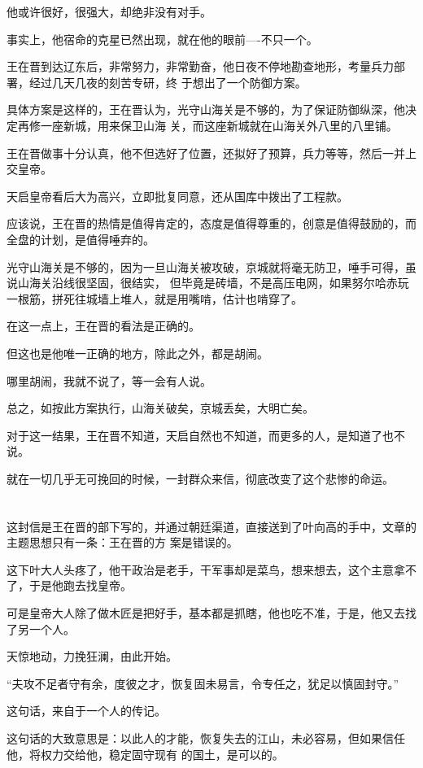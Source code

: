 \documentclass[11pt,a4paper,onecolumn]{article}
\begin{document}
他或许很好，很强大，却绝非没有对手。

事实上，他宿命的克星已然出现，就在他的眼前----不只一个。

王在晋到达辽东后，非常努力，非常勤奋，他日夜不停地勘查地形，考量兵力部署，经过几天几夜的刻苦专研，终
于想出了一个防御方案。

具体方案是这样的，王在晋认为，光守山海关是不够的，为了保证防御纵深，他决定再修一座新城，用来保卫山海
关，而这座新城就在山海关外八里的八里铺。

王在晋做事十分认真，他不但选好了位置，还拟好了预算，兵力等等，然后一并上交皇帝。

天启皇帝看后大为高兴，立即批复同意，还从国库中拨出了工程款。

应该说，王在晋的热情是值得肯定的，态度是值得尊重的，创意是值得鼓励的，而全盘的计划，是值得唾弃的。

光守山海关是不够的，因为一旦山海关被攻破，京城就将毫无防卫，唾手可得，虽说山海关沿线很坚固，很结实，
但毕竟是砖墙，不是高压电网，如果努尔哈赤玩一根筋，拼死往城墙上堆人，就是用嘴啃，估计也啃穿了。

在这一点上，王在晋的看法是正确的。

但这也是他唯一正确的地方，除此之外，都是胡闹。

哪里胡闹，我就不说了，等一会有人说。

总之，如按此方案执行，山海关破矣，京城丢矣，大明亡矣。

对于这一结果，王在晋不知道，天启自然也不知道，而更多的人，是知道了也不说。

就在一切几乎无可挽回的时候，一封群众来信，彻底改变了这个悲惨的命运。

\section[\thesection]{}

这封信是王在晋的部下写的，并通过朝廷渠道，直接送到了叶向高的手中，文章的主题思想只有一条：王在晋的方
案是错误的。

这下叶大人头疼了，他干政治是老手，干军事却是菜鸟，想来想去，这个主意拿不了，于是他跑去找皇帝。

可是皇帝大人除了做木匠是把好手，基本都是抓瞎，他也吃不准，于是，他又去找了另一个人。

天惊地动，力挽狂澜，由此开始。

``夫攻不足者守有余，度彼之才，恢复固未易言，令专任之，犹足以慎固封守。''

这句话，来自于一个人的传记。

这句话的大致意思是：以此人的才能，恢复失去的江山，未必容易，但如果信任他，将权力交给他，稳定固守现有
的国土，是可以的。
\end{document}
